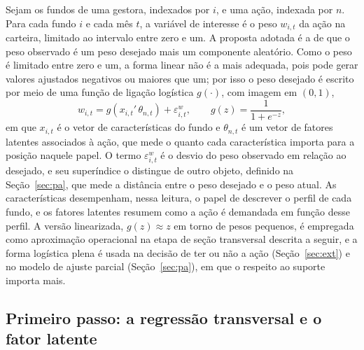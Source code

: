 \documentclass[12pt,a4paper]{article}
\begin{document}
Sejam os fundos de uma gestora, indexados por $i$, e uma ação, indexada por $n$. Para cada fundo
$i$ e cada mês $t$, a variável de interesse é o peso $w_{i,t}$ da ação na carteira, limitado ao
intervalo entre zero e um. A proposta adotada é a de que o peso observado é um peso desejado
mais um componente aleatório. Como o peso é limitado entre zero e um, a forma linear não é a
mais adequada, pois pode gerar valores ajustados negativos ou maiores que um; por isso o peso
desejado é escrito por meio de uma função de ligação logística $g(\cdot)$, com imagem em $(0,1)$,
\begin{equation}
w_{i,t} = g\!\left(x_{i,t}'\,\theta_{n,t}\right) + \varepsilon^{w}_{i,t},
\qquad g(z)=\frac{1}{1+e^{-z}},
\label{eq:logit}
\end{equation}
em que $x_{i,t}$ é o vetor de características do fundo e $\theta_{n,t}$ é um vetor de fatores
latentes associados à ação, que mede o quanto cada característica importa para a posição naquele
papel. O termo $\varepsilon^{w}_{i,t}$ é o desvio do peso observado em relação ao desejado, e seu
superíndice o distingue de outro objeto, definido na Seção~\ref{sec:pa}, que mede a distância
entre o peso desejado e o peso atual. As características desempenham, nessa leitura, o papel de
descrever o perfil de cada fundo, e os fatores latentes resumem como a ação é demandada em
função desse perfil. A versão linearizada, $g(z)\approx z$ em torno de pesos pequenos, é
empregada como aproximação operacional na etapa de seção transversal descrita a seguir, e a
forma logística plena é usada na decisão de ter ou não a ação (Seção~\ref{sec:ext}) e no modelo
de ajuste parcial (Seção~\ref{sec:pa}), em que o respeito ao suporte importa mais.

\subsection{Primeiro passo: a regressão transversal e o fator latente}
\end{document}
